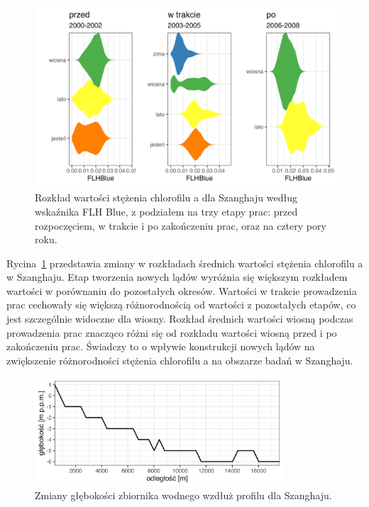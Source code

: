 \documentclass{amuthesis}
\begin{document}
\begin{figure}[t]

{\centering \includegraphics[width=6.25in,height=\textheight]{figures/china/flhblue_violin.png}

}

\caption{\label{fig-cn_flhblue_violin}Rozkład wartości stężenia
chlorofilu a dla Szanghaju według wskaźnika FLH Blue, z podziałem na
trzy etapy prac: przed rozpoczęciem, w trakcie i po zakończeniu prac,
oraz na cztery pory roku.}

\end{figure}

Rycina~\ref{fig-cn_flhblue_violin} przedstawia zmiany w rozkładach
średnich wartości stężenia chlorofilu a w Szanghaju. Etap tworzenia
nowych lądów wyróżnia się większym rozkładem wartości w porównaniu do
pozostałych okresów. Wartości w trakcie prowadzenia prac cechowały się
większą różnorodnością od wartości z pozostałych etapów, co jest
szczególnie widoczne dla wiosny. Rozkład średnich wartości wiosną
podczas prowadzenia prac znacząco różni się od rozkładu wartości wiosną
przed i po zakończeniu prac. Świadczy to o wpływie konstrukcji nowych
lądów na zwiększenie różnorodności stężenia chlorofilu a na obszarze
badań w Szanghaju.

\begin{figure}[t]

{\centering \includegraphics[width=3.64583in,height=\textheight]{figures/china/profile.png}

}

\caption{\label{fig-cn_profile}Zmiany głębokości zbiornika wodnego
wzdłuż profilu dla Szanghaju.}

\end{figure}
\end{document}
